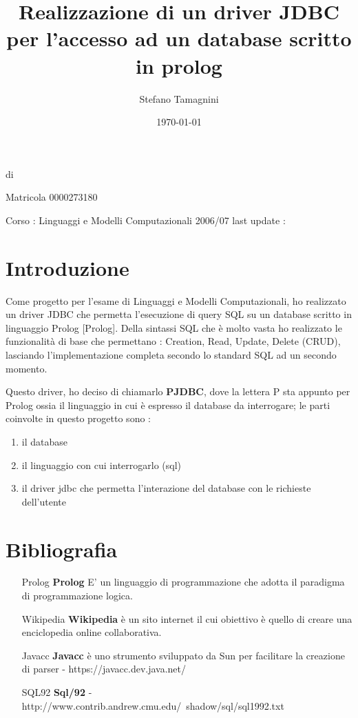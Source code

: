 \documentclass[a4paper,titlepage,12pt]{article}	%
\title{Realizzazione di un driver JDBC per l'accesso ad un database scritto in prolog}
\author{Stefano Tamagnini}
\date{\today}
\makeatletter
\def\maketitle{%
  \null
  \thispagestyle{empty}%
  \vfill
  \begin{center}\leavevmode
    \normalfont
    {\huge \raggedright \@title \par}%
    \hrulefill \par
    di {\LARGE \raggedleft \@author \par }%
    {\raggedleft Matricola 0000273180 \par}%
    \vskip 3cm
    Corso : Linguaggi e Modelli Computazionali 2006/07
    \vskip 1cm
    last update : { \@date\par}%
  \end{center}%
  \vfill
  \null
  \cleardoublepage
  }
\makeatother
\begin{document}
\maketitle

\tableofcontents

\newpage

\section{Introduzione}

Come progetto per l'esame di Linguaggi e Modelli Computazionali, ho realizzato un driver JDBC che permetta l'esecuzione di query SQL su un database scritto in linguaggio Prolog [Prolog]. Della sintassi SQL che è molto vasta ho realizzato le funzionalità di base che permettano : Creation, Read, Update, Delete (CRUD), lasciando l'implementazione completa secondo lo standard SQL ad un secondo momento.
\par 
Questo driver, ho deciso di chiamarlo {\bf PJDBC}, dove la lettera P sta appunto per Prolog ossia il linguaggio in cui è espresso il database da interrogare; le parti coinvolte in questo progetto sono : 
\begin{enumerate}
\item il database
\item il linguaggio con cui interrogarlo (sql)
\item il driver jdbc che permetta l'interazione del database con le richieste dell'utente
\end{enumerate}






	
\section{Bibliografia}	
\begin{enumerate}
	\item[Prolog] {\bf Prolog} E' un linguaggio di programmazione che adotta il paradigma di programmazione logica. 
	\item[Wikipedia] {\bf Wikipedia} è un sito internet il cui obiettivo è quello di creare una enciclopedia online collaborativa. 
	\item[Javacc] {\bf Javacc } è uno strumento sviluppato da Sun per facilitare la creazione di parser - https://javacc.dev.java.net/
	\item[SQL92] {\bf Sql/92} - http://www.contrib.andrew.cmu.edu/~shadow/sql/sql1992.txt
\end{enumerate}
\end{document}
